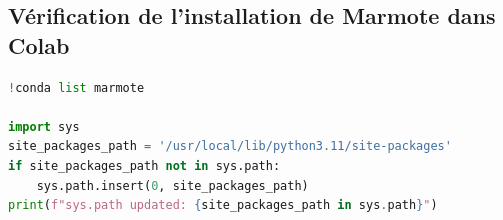 \documentclass[a4paper,12pt,twoside]{article}
\begin{document}
\subsection{Vérification de l'installation de Marmote dans Colab}
\label{annexe:colab-check}
\begin{lstlisting}[language=Python,caption={Cellules ajoutées pour vérifier Marmote dans un notebook Colab.}]
!conda list marmote

import sys
site_packages_path = '/usr/local/lib/python3.11/site-packages'
if site_packages_path not in sys.path:
    sys.path.insert(0, site_packages_path)
print(f"sys.path updated: {site_packages_path in sys.path}")
\end{lstlisting}
\end{document}
